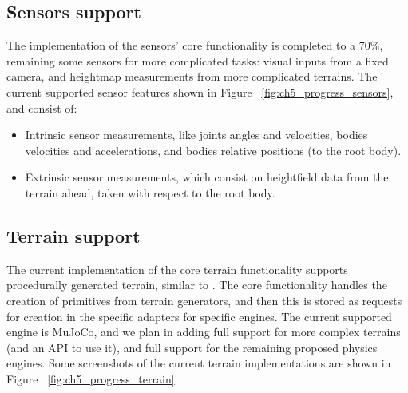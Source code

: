 \figProgressAgents

\subsection*{Sensors support}

The implementation of the sensors' core functionality is completed to a 70\%,
remaining some sensors for more complicated tasks: visual inputs from a fixed camera,
and heightmap measurements from more complicated terrains. The current supported sensor
features shown in Figure ~\ref{fig:ch5_progress_sensors}, and consist of:

\begin{itemize}
    \item Intrinsic sensor measurements, like joints angles and velocities, bodies velocities
          and accelerations, and bodies relative positions (to the root body).
    \item Extrinsic sensor measurements, which consist on heightfield data from the terrain ahead,
          taken with respect to the root body.
\end{itemize}

\figProgressSensors

\subsection*{Terrain support}

The current implementation of the core terrain functionality supports procedurally generated
terrain, similar to \cite{DeepmindEmergenceLocomotion}. The core functionality handles 
the creation of primitives from terrain generators, and then this is stored as 
requests for creation in the specific adapters for specific engines. The current 
supported engine is MuJoCo, and we plan in adding full support for more complex 
terrains (and an API to use it), and full support for the remaining proposed physics 
engines. Some screenshots of the current terrain implementations are shown
in Figure ~\ref{fig:ch5_progress_terrain}.

\figProgressTerrains


\tableAgentFormatsSupport
\tableBackendsSupport